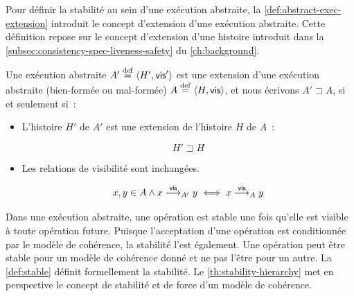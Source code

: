 Pour définir la stabilité au sein d'une exécution abstraite, la \autoref{def:abstract-exec-extension} introduit le concept d'extension d'une exécution abstraite.
Cette définition repose sur le concept d'extension d'une histoire introduit dans la \autoref{subsec:consistency-spec-liveness-safety} du \autoref{ch:background}.

\begin{definition}\label{def:abstract-exec-extension}
Une exécution abstraite $A' \defeq \tuple*{H',\trm{vis}'}$ est une extension d'une exécution abstraite (bien-formée ou mal-formée) $A \defeq \tuple*{H,\trm{vis}}$, et nous écrivons $A' \sqsupset A$, si et seulement si~:
\begin{itemize}
    \item L'histoire $H'$ de $A'$ est une extension de l'histoire $H$ de $A$~:

    \begin{equation*}
    H' \sqsupset H
    \end{equation*}

    \item Les relations de visibilité sont inchangées.

    \begin{equation*}
    x, y \in A \land x \vis_{A'} y \iff x \vis_{A} y
    \end{equation*}
\end{itemize}
\end{definition}


Dans une exécution abstraite, une opération est stable une fois qu'elle est visible à toute opération future.
Puisque l’acceptation d’une opération est conditionnée par le modèle de cohérence, la stabilité l'est également.
Une opération peut être stable pour un modèle de cohérence donné et ne pas l'être pour un autre.
La \autoref{def:stable} définit formellement la stabilité.
Le \autoref{th:stability-hierarchy} met en perspective le concept de stabilité et de force d'un modèle de cohérence.

